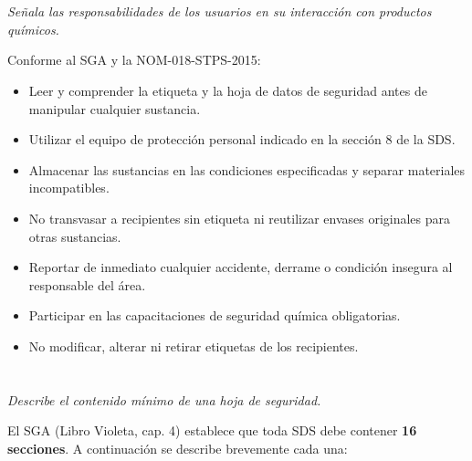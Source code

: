 
{}
\section*{\centering\fontsize{12}{18}}

\textit{Señala las responsabilidades de los usuarios en su interacción con productos químicos.}

\vspace{0.3cm}
Conforme al SGA y la NOM-018-STPS-2015:

\begin{itemize}
    \item Leer y comprender la etiqueta y la hoja de datos de seguridad antes de manipular cualquier sustancia.
    \item Utilizar el equipo de protección personal indicado en la sección 8 de la SDS.
    \item Almacenar las sustancias en las condiciones especificadas y separar materiales incompatibles.
    \item No transvasar a recipientes sin etiqueta ni reutilizar envases originales para otras sustancias.
    \item Reportar de inmediato cualquier accidente, derrame o condición insegura al responsable del área.
    \item Participar en las capacitaciones de seguridad química obligatorias.
    \item No modificar, alterar ni retirar etiquetas de los recipientes.
\end{itemize}


{}
\section*{\centering\fontsize{12}{18}}

\textit{Describe el contenido mínimo de una hoja de seguridad.}

\vspace{0.3cm}
El SGA (Libro Violeta, cap. 4) establece que toda SDS debe contener \textbf{16 secciones}. A continuación se describe brevemente cada una:

